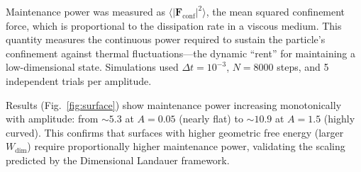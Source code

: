 \documentclass[aps,pre,twocolumn,superscriptaddress,floatfix]{revtex4-2}
\begin{document}
Maintenance power was measured as $\langle|\mathbf{F}_{\mathrm{conf}}|^2\rangle$, the mean squared confinement force, which is proportional to the dissipation rate in a viscous medium. This quantity measures the continuous power required to sustain the particle's confinement against thermal fluctuations---the dynamic ``rent'' for maintaining a low-dimensional state. Simulations used $\Delta t = 10^{-3}$, $N = 8000$ steps, and 5 independent trials per amplitude.

Results (Fig.~\ref{fig:surface}) show maintenance power increasing monotonically with amplitude: from $\sim 5.3$ at $A = 0.05$ (nearly flat) to $\sim 10.9$ at $A = 1.5$ (highly curved). This confirms that surfaces with higher geometric free energy (larger $W_{\mathrm{dim}}$) require proportionally higher maintenance power, validating the scaling predicted by the Dimensional Landauer framework.


\end{document}
